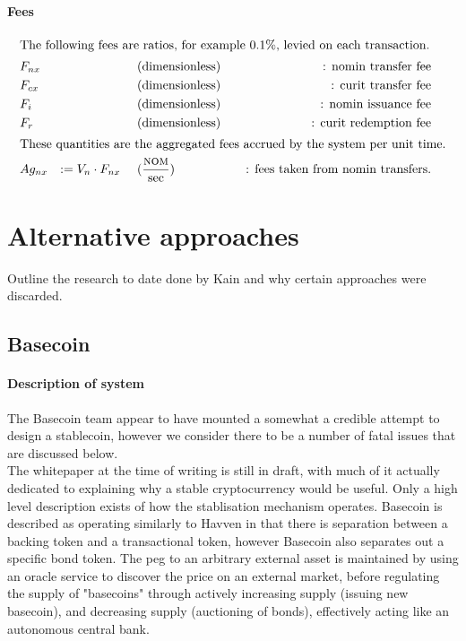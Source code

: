 \documentclass{article}
\begin{document}
\paragraph{Fees}
\begin{align*}
\intertext{The following fees are ratios, for example 0.1\%, levied on each transaction.}
&F_{nx} & \ && &\text{(dimensionless)} && &\text{: nomin transfer fee} \\
&F_{cx} & \ && &\text{(dimensionless)} && &\text{: curit transfer fee} \\
&F_i & \ && &\text{(dimensionless)} && &\text{: nomin issuance fee} \\
&F_r & \ && &\text{(dimensionless)} && &\text{: curit redemption fee} \\
\intertext{These quantities are the aggregated fees accrued by the system per unit time.}
&Ag_{nx} &:= V_n \cdot F_{nx} \ && &(\frac{\textsc{nom}{}}{\text{sec}}) && &\text{: fees taken from nomin transfers.}
\end{align*}

\pagebreak
\section{Alternative approaches}

Outline the research to date done by Kain and why certain approaches were discarded.



\subsection{Basecoin}

\paragraph{Description of system}

The Basecoin team appear to have mounted a somewhat a credible attempt to design a stablecoin, however we consider there to be a number of fatal issues that are discussed below. \\

\noindent The whitepaper at the time of writing is still in draft, with much of it actually dedicated to explaining why a stable cryptocurrency would be useful. Only a high level description exists of how the stablisation mechanism operates. Basecoin is described as operating similarly to Havven in that there is separation between a backing token and a transactional token, however Basecoin also separates out a specific bond token. The peg to an arbitrary external asset is maintained by using an oracle service to discover the price on an external market, before regulating the supply of "basecoins" through actively increasing supply (issuing new basecoin), and decreasing supply (auctioning of bonds), effectively acting like an autonomous central bank. \\
\end{document}
